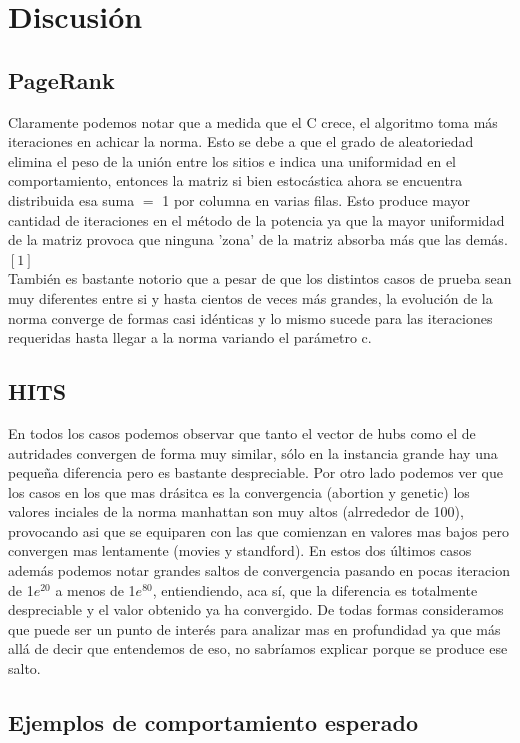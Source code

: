 \section{Discusi\'on}

\subsection{PageRank}
Claramente podemos notar que a medida que el C crece, el algoritmo toma más iteraciones en achicar la norma. Esto se debe a que el grado de aleatoriedad elimina el peso de la unión entre los sitios e indica una uniformidad en el comportamiento, entonces la matriz si bien estocástica ahora se encuentra distribuida esa suma $=$ 1 por columna en varias filas. Esto produce mayor cantidad de iteraciones en el método de la potencia ya que la mayor uniformidad de la matriz provoca que ninguna 'zona' de la matriz absorba más que las demás.   $[1]$\\
También es bastante notorio que a pesar de que los distintos casos de prueba sean muy diferentes entre si y hasta cientos de veces más grandes, la evolución de la norma converge de formas casi idénticas y lo mismo sucede para las iteraciones requeridas hasta llegar a la norma variando el parámetro c.



\subsection{HITS}
En todos los casos podemos observar que tanto el vector de hubs como el de autridades convergen de forma muy similar, sólo en la instancia grande hay una pequeña diferencia pero es bastante despreciable. 
Por otro lado podemos ver que los casos en los que mas drásitca es la convergencia (abortion y genetic) los valores inciales de la norma manhattan son muy altos (alrrededor de 100), provocando asi que se equiparen con las que comienzan en valores mas bajos pero convergen mas lentamente (movies y standford).
En estos dos últimos casos además podemos notar grandes saltos de convergencia pasando en pocas iteracion de 1$e^{20}$ a menos de 1$e^{80}$, entiendiendo, aca sí, que la diferencia es totalmente despreciable y el valor obtenido ya ha convergido. De todas formas consideramos que puede ser un punto de interés para analizar mas en profundidad ya que más allá de decir que entendemos de eso, no sabríamos explicar porque se produce ese salto. 

\subsection{Ejemplos de comportamiento esperado}

